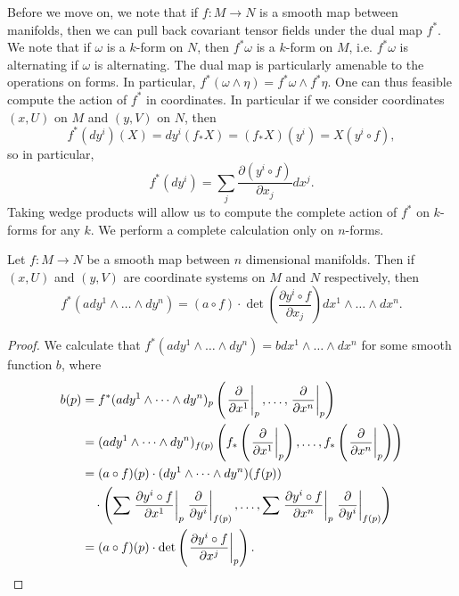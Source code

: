 Before we move on, we note that if $f: M \to N$ is a smooth map between manifolds, then we can pull back covariant tensor fields under the dual map $f^*$. We note that if $\omega$ is a $k$-form on $N$, then $f^* \omega$ is a $k$-form on $M$, i.e. $f^* \omega$ is alternating if $\omega$ is alternating. The dual map is particularly amenable to the operations on forms. In particular, $f^*(\omega \wedge \eta) = f^*\omega \wedge f^* \eta$. One can thus feasible compute the action of $f^*$ in coordinates. In particular if we consider coordinates $(x,U)$ on $M$ and $(y,V)$ on $N$, then
%
\[ f^*(dy^i)(X) = dy^i(f_* X) = (f_* X)(y^i) = X(y^i \circ f), \]
%
so in particular,
%
\[ f^*(dy^i) = \sum_j \frac{\partial (y^i \circ f)}{\partial x_j} dx^j. \]
%
Taking wedge products will allow us to compute the complete action of $f^*$ on $k$-forms for any $k$. We perform a complete calculation only on $n$-forms.

\begin{lemma}
    Let $f: M \to N$ be a smooth map between $n$ dimensional manifolds. Then if $(x,U)$ and $(y,V)$ are coordinate systems on $M$ and $N$ respectively, then
    \[ f^*(a dy^1 \wedge \dots \wedge dy^n) = (a \circ f) \cdot \det \left( \frac{\partial y^i \circ f}{\partial x_j} \right) dx^1 \wedge \dots \wedge dx^n. \]
\end{lemma}
\begin{proof}
    We calculate that $f^*(a dy^1 \wedge \dots \wedge dy^n) = b dx^1 \wedge \dots \wedge dx^n$ for some smooth function $b$, where
    \begin{align*}
        b(p) &= f^*(a dy^1 \wedge \dots \wedge dy^n)_p \left( \left. \frac{\partial}{\partial x^1} \right|_p, \dots, \left. \frac{\partial}{\partial x^n} \right|_p \right)\\
        &= (a dy^1 \wedge \dots \wedge dy^n)_{f(p)} \left(f_*\left( \left. \frac{\partial}{\partial x^1} \right|_p \right), \dots, f_* \left( \left. \frac{\partial}{\partial x^n} \right|_p \right) \right)\\
        &= (a \circ f)(p) \cdot (dy^1 \wedge \dots \wedge dy^n)(f(p)) \\
        &\ \ \ \cdot \left( \sum \left. \frac{\partial y^i \circ f}{\partial x^1} \right|_p \left. \frac{\partial}{\partial y^i} \right|_{f(p)}, \dots, \sum \left. \frac{\partial y^i \circ f}{\partial x^n} \right|_p \left. \frac{\partial}{\partial y^i} \right|_{f(p)} \right)\\
        &= (a \circ f)(p) \cdot \det \left( \left. \frac{\partial y^i \circ f}{\partial x^j} \right|_p \right). \qedhere
    \end{align*}
\end{proof}

